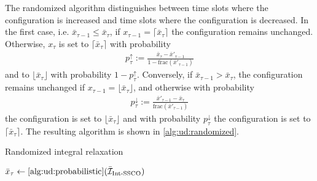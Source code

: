 The randomized algorithm distinguishes between time slots where the configuration is increased and time slots where the configuration is decreased. In the first case, i.e. $\bar{x}_{\tau-1} \leq \bar{x}_{\tau}$, if $x_{\tau-1} = \lceil\bar{x}_{\tau}\rceil$  the configuration remains unchanged. Otherwise, $x_{\tau}$ is set to $\lceil\bar{x}_{\tau}\rceil$ with probability \begin{align*}
    p_{\tau}^{\uparrow} := \frac{\bar{x}_{\tau} - \bar{x}'_{\tau-1}}{1 - \text{frac}(\bar{x}'_{\tau-1})}
\end{align*} and to $\lfloor\bar{x}_{\tau}\rfloor$ with probability $1 - p_{\tau}^{\uparrow}$. Conversely, if $\bar{x}_{\tau-1} > \bar{x}_{\tau}$, the configuration remains unchanged if $x_{\tau-1} = \lfloor\bar{x}_{\tau}\rfloor$, and otherwise with probability \begin{align*}
    p_{\tau}^{\downarrow} := \frac{\bar{x}'_{\tau-1} - \bar{x}_{\tau}}{\text{frac}(\bar{x}'_{\tau-1})}
\end{align*} the configuration is set to $\lfloor\bar{x}_{\tau}\rfloor$ and with probability $p_{\tau}^{\downarrow}$ the configuration is set to $\lceil\bar{x}_{\tau}\rceil$. The resulting algorithm is shown in \autoref{alg:ud:randomized}.

\begin{algorithm}
    \caption{Randomized integral relaxation \cite{Albers2018}}\label{alg:ud:randomized}
    $\bar{x}_{\tau} \gets \text{\autoref{alg:ud:probabilistic}}(\bar{\mathcal{I}}_{\text{Int-SSCO}})$\;
\end{algorithm}


